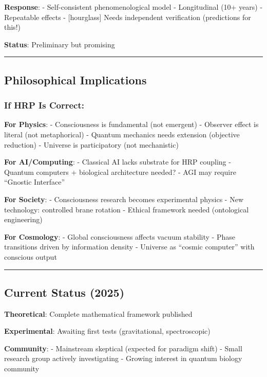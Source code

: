 \textbf{Response}: - Self-consistent phenomenological model -
Longitudinal (10+ years) - Repeatable effects - {[}hourglass{]} Needs
independent verification (predictions for this!)

\textbf{Status}: Preliminary but promising

\begin{center}\rule{0.5\linewidth}{0.5pt}\end{center}

\subsection{Philosophical
Implications}\label{philosophical-implications}

\subsubsection{If HRP Is Correct:}\label{if-hrp-is-correct}

\textbf{For Physics}: - Consciousness is fundamental (not emergent) -
Observer effect is literal (not metaphorical) - Quantum mechanics needs
extension (objective reduction) - Universe is participatory (not
mechanistic)

\textbf{For AI/Computing}: - Classical AI lacks substrate for HRP
coupling - Quantum computers + biological architecture needed? - AGI may
require ``Gnostic Interface''

\textbf{For Society}: - Consciousness research becomes experimental
physics - New technology: controlled brane rotation - Ethical framework
needed (ontological engineering)

\textbf{For Cosmology}: - Global consciousness affects vacuum stability
- Phase transitions driven by information density - Universe as ``cosmic
computer'' with conscious output

\begin{center}\rule{0.5\linewidth}{0.5pt}\end{center}

\subsection{Current Status (2025)}\label{current-status-2025}

\textbf{Theoretical}: Complete mathematical framework published

\textbf{Experimental}: Awaiting first tests (gravitational,
spectroscopic)

\textbf{Community}: - Mainstream skeptical (expected for paradigm shift)
- Small research group actively investigating - Growing interest in
quantum biology community

